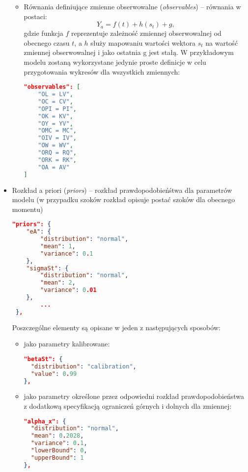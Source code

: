 \begin{itemize}
\begin{itemize}
            
            \item Równania definiujące zmienne obserwowalne (\emph{observables}) -- równania w postaci:
            \begin{equation}
                Y_{a} = f(t) + h(s_t) + g,
            \end{equation}
            gdzie funkcja $f$ reprezentuje zależność zmiennej obserwowalnej od obecnego czasu $t$, a $h$ służy mapowaniu wartości wektora $s_t$ na wartość zmiennej obserwowalnej i jako ostatnia g jest stałą. W przykładowym modelu zostaną wykorzystane jedynie proste definicje w celu przygotowania wykresów dla wszystkich zmiennych:
            \begin{lstlisting}[language=json,firstnumber=29]
"observables": [
    "OL = LV",
    "OC = CV",
    "OPI = PI",
    "OK = KV",
    "OY = YV",
    "OMC = MC",
    "OIV = IV",
    "OW = WV",
    "ORQ = RQ",
    "ORK = RK",
    "OA = AV"
]
            \end{lstlisting}
        \end{itemize}
    \item Rozkład a priori (\emph{priors}) -- rozkład prawdopodobieńśtwa dla parametrów modelu (w przypadku szoków rozkład opisuje postać szoków dla obecnego momentu)
    \begin{lstlisting}[language=json,firstnumber=43]
 "priors": {
    "eA": {
        "distribution": "normal",
        "mean": 1,
        "variance": 0.1
    },
    "sigmaSt": {
        "distribution": "normal",
        "mean": 2,
        "variance": 0.01
    },
        ...
 },
    \end{lstlisting}
    Poszczególne elementy są opisane w jeden z następujących sposobów:
    \begin{itemize}
        \item jako parametry kalibrowane:
            \begin{lstlisting}[language=json,firstnumber=43]
"betaSt": {
  "distribution": "calibration",
  "value": 0.99
},
            \end{lstlisting}
        \item jako parametry określone przez odpowiedni rozkład prawdopodobieństwa z dodatkową specyfikacją ograniczeń górnych i dolnych dla zmiennej:
            \begin{lstlisting}[language=json,firstnumber=43]
"alpha_x": {
  "distribution": "normal",
  "mean": 0.2028,
  "variance": 0.1,
  "lowerBound": 0,
  "upperBound": 1
},
            \end{lstlisting}        

\end{itemize}
\end{itemize}
